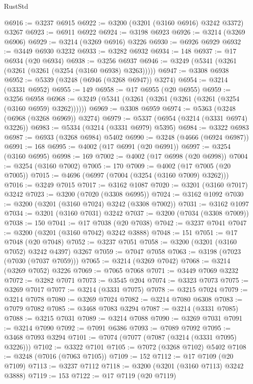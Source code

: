 \begin{lexlean}{RustStd}
\begin{coremodule}
{\begin{coremodule}
{{{{{{{{{{{{{{{{{{{{{{{{{@6916 := @3237 @6915
@6922 := @3200 (@3201 (@3160 @6916) @3242 @3372) @3267
@6923 := @6911 @6922
@6924 := @3198 @6923
@6926 := @3214 (@3269 @6906)
@6929 := @3214 (@3269 @6916) @3226
@6930 := @6926 @6929
@6932 := @3449 @6930 @3232
@6933 := @3282 @6932
@6934 := 148
@6937 := @17 @6934 (@20 @6934)
@6938 := @3256 @6937
@6946 := @3249 (@5341 (@3261 (@3261 (@3261 (@3254 (@3160 @6938) @3263)))))
@6947 := @3308 @6938
@6952 := @5339 (@3248 (@6946 (@3268 @6947)) @3274)
@6954 := @3214 (@3331 @6952)
@6955 := 149
@6958 := @17 @6955 (@20 @6955)
@6959 := @3256 @6958
@6968 := @3249 (@5341 (@3261 (@3261 (@3261 (@3261 (@3254 (@3160 @6959) @3262))))))
@6969 := @3308 @6959
@6974 := @5363 (@3248 (@6968 (@3268 @6969)) @3274)
@6979 := @5337 (@6954 (@3214 (@3331 @6974) @3226))
@6983 := @5334 (@3214 (@3331 @6979) @5395)
@6984 := @3322 @6983
@6987 := @6933 (@3268 @6984) @5402
@6990 := @3248 (@4666 (@6924 @6987))
@6991 := 168
@6995 := @4002 (@17 @6991 (@20 @6991))
@6997 := @3254 (@3160 @6995)
@6998 := 169
@7002 := @4002 (@17 @6998 (@20 @6998))
@7004 := @3254 (@3160 @7002)
@7005 := 170
@7009 := @4002 (@17 @7005 (@20 @7005))
@7015 := @4696 (@6997 (@7004 (@3254 (@3160 @7009) @3262)))
@7016 := @3249 @7015
@7017 := @3162 @1087
@7020 := @3201 (@3160 @7017) @3242
@7023 := @3200 (@7020 (@3308 @6995))
@7024 := @3162 @1092
@7030 := @3200 (@3201 (@3160 @7024) @3242 (@3308 @7002))
@7031 := @3162 @1097
@7034 := @3201 (@3160 @7031) @3242
@7037 := @3200 (@7034 (@3308 @7009))
@7038 := 150
@7041 := @17 @7038 (@20 @7038)
@7042 := @3237 @7041
@7047 := @3200 (@3201 (@3160 @7042) @3242 @3888)
@7048 := 151
@7051 := @17 @7048 (@20 @7048)
@7052 := @3237 @7051
@7058 := @3200 (@3201 (@3160 @7052) @3242 @4397) @3267
@7059 := @7047 @7058
@7063 := @3198 (@7023 (@7030 (@7037 @7059)))
@7065 := @3214 (@3269 @7042)
@7068 := @3214 (@3269 @7052) @3226
@7069 := @7065 @7068
@7071 := @3449 @7069 @3232
@7072 := @3282 @7071
@7073 := @3545 @204
@7074 := @3323 @7073
@7075 := @3269 @7017
@7077 := @3214 (@3331 @7075)
@7078 := @3215 @7024
@7079 := @3214 @7078
@7080 := @3269 @7024
@7082 := @3214 @7080 @6308
@7083 := @7079 @7082
@7085 := @3468 @7083 @3294
@7087 := @3214 (@3331 @7085)
@7088 := @3215 @7031
@7089 := @3214 @7088
@7090 := @3269 @7031
@7091 := @3214 @7090
@7092 := @7091 @6386
@7093 := @7089 @7092
@7095 := @3468 @7093 @3294
@7101 := @7074 (@7077 (@7087 (@3214 (@3331 @7095) @3226)))
@7102 := @3322 @7101
@7105 := @7072 (@3268 @7102) @5402
@7108 := @3248 (@7016 (@7063 @7105))
@7109 := 152
@7112 := @17 @7109 (@20 @7109)
@7113 := @3237 @7112
@7118 := @3200 (@3201 (@3160 @7113) @3242 @3888)
@7119 := 153
@7122 := @17 @7119 (@20 @7119)
}}}}}}}}}}}}}}}}}}}}}}}}}
\end{coremodule}}
\end{coremodule}
\end{lexlean}
